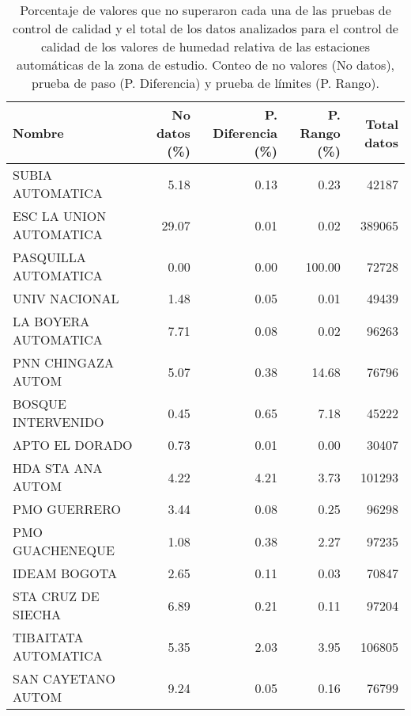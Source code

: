 \begin{table}[H]
\begin{center}

\caption{Porcentaje de valores que no superaron cada una de las pruebas de control de calidad y el total de los datos analizados para el control de calidad de los valores de humedad relativa de las estaciones automáticas de la zona de estudio. Conteo de no valores (No datos), prueba de paso (P. Diferencia) y prueba de límites (P. Rango).}
\label{tabla:val_humedad}

\begin{tabular}{p{5cm}rrrr}
\toprule
      Nombre &  No datos (\%) &  P. Diferencia (\%) &  P. Rango (\%) & Total datos \\
\midrule
         SUBIA AUTOMATICA &      5.18 &           0.13 &      0.23 &         42187 \\
 ESC LA UNION AUTOMATICA &     29.07 &           0.01 &      0.02 &        389065 \\
    PASQUILLA AUTOMATICA &      0.00 &           0.00 &    100.00 &         72728 \\
           UNIV NACIONAL &      1.48 &           0.05 &      0.01 &         49439 \\
    LA BOYERA AUTOMATICA &      7.71 &           0.08 &      0.02 &         96263 \\
      PNN CHINGAZA AUTOM &      5.07 &           0.38 &     14.68 &         76796 \\
      BOSQUE INTERVENIDO &      0.45 &           0.65 &      7.18 &         45222 \\
          APTO EL DORADO &      0.73 &           0.01 &      0.00 &         30407 \\
       HDA STA ANA AUTOM &      4.22 &           4.21 &      3.73 &        101293 \\
            PMO GUERRERO &      3.44 &           0.08 &      0.25 &         96298 \\
         PMO GUACHENEQUE &      1.08 &           0.38 &      2.27 &         97235 \\
            IDEAM BOGOTA &      2.65 &           0.11 &      0.03 &         70847 \\
      STA CRUZ DE SIECHA &      6.89 &           0.21 &      0.11 &         97204 \\
    TIBAITATA AUTOMATICA &      5.35 &           2.03 &      3.95 &        106805 \\
      SAN CAYETANO AUTOM &      9.24 &           0.05 &      0.16 &         76799 \\

\end{tabular}
\end{center}
\end{table}

